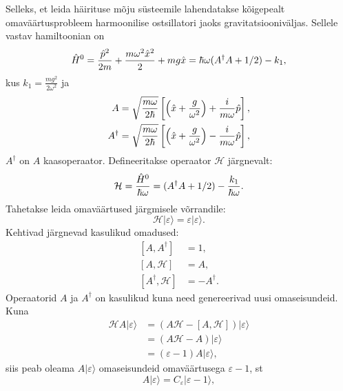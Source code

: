 \documentclass{trkut}%
\renewcommand\ket[1]{{|{#1}\rangle}}
\begin{document}
Selleks, et leida häirituse mõju süsteemile lahendatakse kõigepealt omaväärtusprobleem harmoonilise ostsillatori jaoks gravitatsiooniväljas. Sellele vastav hamiltoonian on
\begin{equation}
    \op[0]{H}=\frac{\op{p}^2}{2m}+\frac{m\omega^2 \op{x}^2}{2} + mg\op{x}=\hbar \omega (A^\dagger A + 1/2)-k_1,
\end{equation}
kus $k_1=\frac{mg^2}{2\omega^2}$ ja
\begin{align}
    \begin{split}
        A &= \sqrt{\frac{m\omega}{2\hbar}}\left[ \left( \op{x} + \frac{g}{\omega^2} \right) + \frac{i}{m\omega} \op{p} \right], \\
        A^\dagger &= \sqrt{\frac{m\omega}{2\hbar}}\left[ \left( \op{x} + \frac{g}{\omega^2} \right) - \frac{i}{m\omega} \op{p} \right],
    \end{split}
\end{align}
$A^\dagger$ on $A$ kaasoperaator.
Defineeritakse operaator $\mathcal{H}$ järgnevalt:
\begin{equation}
    \mathcal{H} = \frac{\op[0]{H}}{\hbar \omega}=(A^\dagger A + 1/2)-\frac{k_1}{\hbar \omega}.
    \label{mathcalH}
\end{equation}
Tahetakse leida omaväärtused järgmisele võrrandile:
\begin{equation}
    \mathcal{H}\ket{\varepsilon}=\varepsilon \ket{\varepsilon}.
\end{equation}
Kehtivad järgnevad kasulikud omadused:
\begin{align}
    \left[A, A^\dagger\right] &= 1, \\
    \left[A, \mathcal{H}\right] &=A, \\
    \left[A^\dagger, \mathcal{H}\right] &= -A^\dagger.
\end{align}
Operaatorid $A$ ja $A^\dagger$ on kasulikud kuna need genereerivad uusi omaseisundeid. Kuna
\begin{align}
        \mathcal{H}A\ket{\varepsilon}&=\left(A\mathcal{H}-[A, \mathcal{H}]\right)\ket{\varepsilon} \nonumber\\
        &=(A\mathcal{H}-A)\ket{\varepsilon} \nonumber\\
        &=(\varepsilon - 1)A\ket{\varepsilon},
\end{align}
siis peab oleama $A\ket{\varepsilon}$ omaseisundeid omaväärtusega $\varepsilon - 1$, st
\begin{equation}
    A\ket{\varepsilon}=C_\varepsilon \ket{\varepsilon -1},
    \label{cepsilon}
\end{equation}
\end{document}
